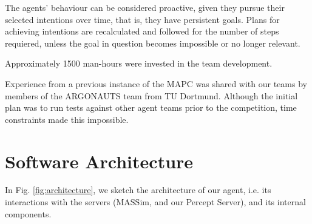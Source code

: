 \documentclass{llncs2e/llncs}
\begin{document}
    The agents' behaviour can be considered proactive, given they pursue their 
    selected intentions over time, that is, they have persistent goals. Plans 
    for achieving intentions are recalculated and followed for the number of
    steps requiered, unless the goal in question becomes impossible or no longer
    relevant.

    Approximately 1500 man-hours were invested in the team development.

    Experience from a previous instance of the MAPC was shared with our teams by
    members of the ARGONAUTS team from TU Dortmund\cite{Holzgen:2011}. Although
    the initial plan was to run tests against other agent teams prior to the
    competition, time constraints made this impossible.

\section{Software Architecture}


    In Fig. \ref{fig:architecture}, we sketch the architecture of our agent, 
    i.e. its interactions with the servers (MASSim, and our Percept Server), 
    and its internal components.
 
\end{document}
